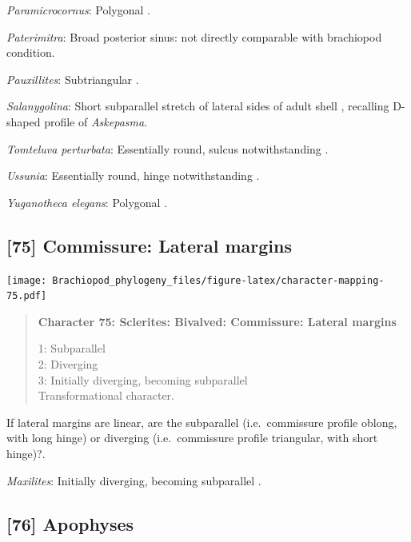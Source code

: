 \documentclass[openany]{book}
\begin{document}
\hypertarget{Paramicrocornus-coding-74}{}
\emph{Paramicrocornus}: Polygonal \citep{Zhang2018Ahyolithid}.

\hypertarget{Paterimitra-coding-74}{}
\emph{Paterimitra}: Broad posterior sinus: not directly comparable with
brachiopod condition.

\hypertarget{Pauxillites-coding-74}{}
\emph{Pauxillites}: Subtriangular \citep{Malinky1987}.

\hypertarget{Salanygolina-coding-74}{}
\emph{Salanygolina}: Short subparallel stretch of lateral sides of adult
shell \citep[fig. 1a]{Holmer2009Theenigmatic}, recalling D-shaped
profile of \emph{Askepasma}.

\hypertarget{Tomteluva_perturbata-coding-74}{}
\emph{Tomteluva perturbata}: Essentially round, sulcus notwithstanding
\citep{Streng2016Anew}.

\hypertarget{Ussunia-coding-74}{}
\emph{Ussunia}: Essentially round, hinge notwithstanding
\citep{Williams2000LinguliformeaCraniiformea}.

\hypertarget{Yuganotheca_elegans-coding-74}{}
\emph{Yuganotheca elegans}: Polygonal \citep{Zhang2014Anearly}.

\subsection*{{[}75{]} Commissure: Lateral
margins}\label{commissure-lateral-margins}

\texttt{[image: Brachiopod\_phylogeny\_files/figure-latex/character-mapping-75.pdf]}

\begin{quote}
\textbf{Character 75: Sclerites: Bivalved: Commissure: Lateral margins}

1: Subparallel\\
2: Diverging\\
3: Initially diverging, becoming subparallel\\
Transformational character.
\end{quote}

If lateral margins are linear, are the subparallel (i.e.~commissure
profile oblong, with long hinge) or diverging (i.e.~commissure profile
triangular, with short hinge)?.

\hypertarget{Maxilites-coding-75}{}
\emph{Maxilites}: Initially diverging, becoming subparallel
\citep{MartiMus2005}.

\subsection*{{[}76{]} Apophyses}\label{apophyses}
\end{document}

